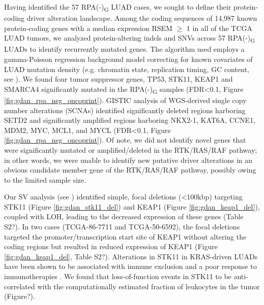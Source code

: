 \documentclass[phd,tocprelim]{cornell}
\begin{document}
Having identified the 57 RPA(-)\textsubscript{G} LUAD cases, we sought to define their protein-coding driver alteration landscape. Among the coding sequences of 14,987 known protein-coding genes with a median expression RSEM $\ge$ 1 in all of the TCGA LUAD tumors, we analyzed protein-altering indels and SNVs across 57 RPA(-)\textsubscript{G} LUADs to identify recurrently mutated genes. The algorithm used employs a gamma-Poisson regression background model \cite{Imielinski2017-nt} correcting for known covariates of LUAD mutation density (e.g. chromatin state, replication timing, GC content, see ). We found four tumor suppressor genes, TP53, STK11, KEAP1 and SMARCA4 significantly mutated in the RPA(-)\textsubscript{G} samples (FDR<0.1, Figure \ref{fig:gdan_rpa_neg_oncoprint}). GISTIC analysis \cite{Mermel2011-gt} of WGS-derived single copy number alterations (SCNAs) identified significantly deleted regions harboring SETD2 and significantly amplified regions harboring NKX2-1, KAT6A, CCNE1, MDM2, MYC, MCL1, and MYCL (FDR<0.1, Figure \ref{fig:gdan_rpa_neg_oncoprint}). Of note, we did not identify novel genes that were significantly mutated or amplified/deleted in the RTK/RAS/RAF pathway; in other words, we were unable to identify new putative driver alterations in an obvious candidate member gene of the RTK/RAS/RAF pathway, possibly owing to the limited sample size.


Our SV analysis (see ) identified simple, focal deletions (<100kbp) targeting STK11 (Figure \ref{fig:gdan_stk11_del}) and KEAP1 (Figure \ref{fig:gdan_keap1_del}), coupled with LOH, leading to the decreased expression of these genes (Table S2?). In two cases (TCGA-86-7711 and TCGA-50-6592), the focal deletions targeted the promoter/transcription start site of KEAP1 without altering the coding regions but resulted in reduced expression of KEAP1 (Figure \ref{fig:gdan_keap1_del}, Table S2?). Alterations in STK11 in KRAS-driven LUADs have been shown to be associated with immune exclusion and a poor response to immunotherapies \cite{Skoulidis2018-be}. We found that loss-of-function events in STK11 to be anti-correlated with the computationally estimated fraction of leukocytes in the tumor (Figure?). %
\end{document}
